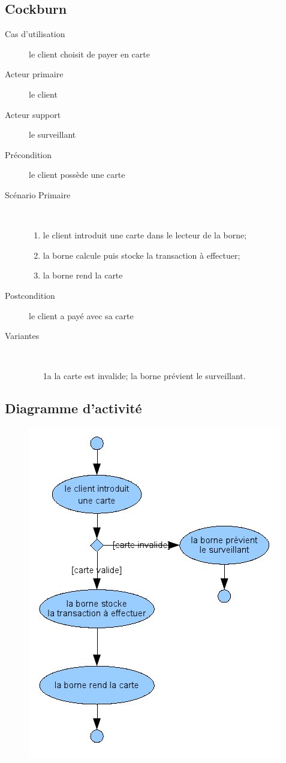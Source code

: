\documentclass[a4paper]{article}
\begin{document}
\subsection{Cockburn}
\begin{description}
	\item[Cas d'utilisation] le client choisit de payer en carte
	\item[Acteur primaire] le client
	\item[Acteur support] le surveillant
	\item[Pr\'econdition] le client poss\`ede une carte
	\item[Sc\'enario Primaire] \
	\begin{enumerate}
		\item le client introduit une carte dans le lecteur de la borne;
		\item la borne calcule puis stocke la transaction \`a effectuer;
		\item la borne rend la carte
	\end{enumerate}
	\item[Postcondition] le client a pay\'e avec sa carte
	\item[Variantes] \
	\begin{enumerate}
		\item[1a] la carte est invalide; la borne pr\'evient le surveillant.
	\end{enumerate}
\end{description}
\subsection{Diagramme d'activit\'e}
\begin{figure}[!ht]
\centering
\includegraphics[scale=.7]{imgs/act_cartepayer.jpg}
\end{figure}
\end{document}
